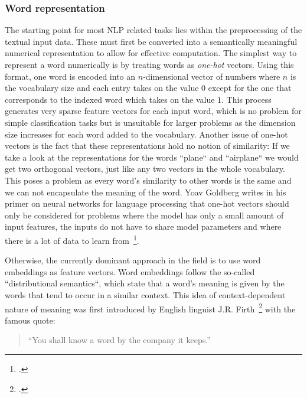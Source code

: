 \subsubsection{Word representation}
\label{sub:word_representation}

The starting point for most NLP related tasks lies within the preprocessing of the textual input data. These must first be converted into a semantically meaningful numerical representation to allow for effective computation. The simplest way to represent a word numerically is by treating words as \textit{one-hot} vectors. Using this format, one word is encoded into an $ n $-dimensional vector of numbers where $ n $ is the vocabulary size and each entry takes on the value $ 0 $ except for the one that corresponds to the indexed word which takes on the value $ 1 $. This process generates very sparse feature vectors for each input word, which is no problem for simple classification tasks but is unsuitable for larger problems as the dimension size increases for each word added to the vocabulary. Another issue of one-hot vectors is the fact that these representations hold no notion of similarity: If we take a look at the representations for the words “plane“ and “airplane“ we would get two orthogonal vectors, just like any two vectors in the whole vocabulary. This poses a problem as every word's similarity to other words is the same and we can not encapsulate the meaning of the word. Yoav Goldberg writes in his primer on neural networks for language processing that one-hot vectors should only be considered for problems where the model has only a small amount of input features, the inputs do not have to share model parameters and where there is a lot of data to learn from~\footcite{DBLP:journals/corr/Goldberg15c}.

Otherwise, the currently dominant approach in the field is to use word embeddings as feature vectors. Word embeddings follow the so-called “distributional semantics“, which state that a word's meaning is given by the words that tend to occur in a similar context. This idea of context-dependent nature of meaning was first introduced by English linguist J.R. Firth~\footcite[1]{firth1930stated} with the famous quote:

\begin{quote}
  ``You shall know a word by the company it keeps.''
\end{quote}


